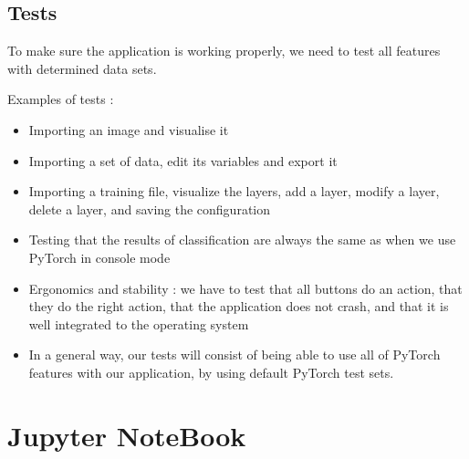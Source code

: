 \subsection{Tests}
To make sure the application is working properly, we need to test all features with determined data sets.

Examples of tests :
\begin{itemize}
\item Importing an image and visualise it
\item Importing a set of data, edit its variables and export it
\item Importing a training file, visualize the layers, add a layer, modify a layer, delete a layer, and saving the configuration
\item Testing that the results of classification are always the same as when we use PyTorch in console mode
\item Ergonomics and stability : we have to test that all buttons do an action, that they do the right action, that the application does not crash, and that it is well integrated to the operating system
\end{itemize}
\begin{itemize}
\item In a general way, our tests will consist of being able to use all of PyTorch features with our application, by using default PyTorch test sets.
\end{itemize}

\section{Jupyter NoteBook}
\pagebreak
